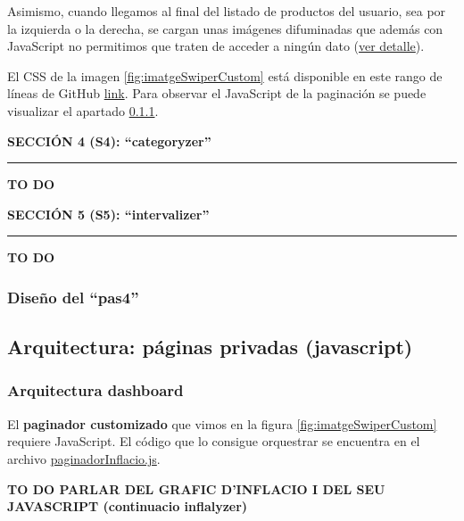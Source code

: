 \documentclass[a4paper,12pt]{report}
\begin{document}
	Asimismo, cuando llegamos al final del listado de productos del usuario, sea por la izquierda o la derecha, se cargan unas imágenes difuminadas que además con JavaScript no permitimos que traten de acceder a ningún dato (\href{https://github.com/blackcub3s/mercApp/blob/main/APP%20WEB/__frontend__produccio__/app/img/dashboard/paginadorEsqDifuminat.png}{ver detalle}).
	
	El CSS de la imagen \ref{fig:imatgeSwiperCustom} está disponible en este rango de líneas de GitHub \href{https://github.com/blackcub3s/mercApp/blob/4ddc34194763af7a246ffabb14146ad9b4b2c5db/APP%20WEB/__frontend__produccio__/app/css/dashboard/estils.css#L155}{link}. Para observar el JavaScript de la paginación se puede visualizar el apartado \ref{sec:paginadorJavascriptArquitectura}.
	
	
	
	
	\noindent \textbf{SECCIÓN 4 (S4): ``categoryzer''}
	\hrule
	\vspace{.5em}
	
	\textbf{TO DO}
	
	
	\noindent \textbf{SECCIÓN 5 (S5): ``intervalizer''}
	\hrule
	\vspace{.5em}
	
	\textbf{TO DO}
	
	\subsubsection{Diseño del ``pas4''}
	
	\subsection{Arquitectura: páginas privadas (javascript)}
	
	\subsubsection{Arquitectura dashboard}
	\label{sec:paginadorJavascriptArquitectura}
	
	El \textbf{paginador customizado} que vimos en la figura \ref{fig:imatgeSwiperCustom} requiere JavaScript. El código que lo consigue orquestrar se encuentra en el archivo \href{https://github.com/blackcub3s/mercApp/blob/main/APP%20WEB/__frontend__produccio__/app/js/dashboard/paginadorInflacio.js}{paginadorInflacio.js}.
	
	\textbf{TO DO PARLAR DEL GRAFIC D'INFLACIO I DEL SEU JAVASCRIPT (continuacio inflalyzer)}
	
\end{document}
